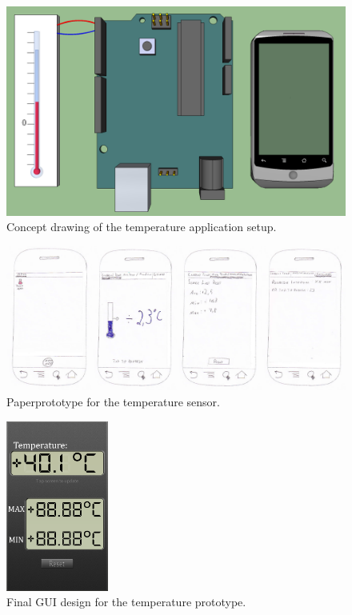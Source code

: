 \begin{figure}[H]
	\centering
	\includegraphics[scale=0.35]{img/design-temperature}
	\caption{Concept drawing of the temperature application setup.}
	\label{fig:design-temperature}
\end{figure}

\begin{figure}[H]
\centering 
\includegraphics[width=1.0\textwidth]{img/prototype2-paper.png}
\caption{Paperprototype for the temperature sensor.}
\label{fig:prototype2-paper}
\end{figure}

\begin{figure}[H]
\centering 
\includegraphics[width=0.3\textwidth]{img/prototype2-gui.png}
\caption{Final GUI design for the temperature prototype.}
\label{fig:prototype2-gui}
\end{figure}

